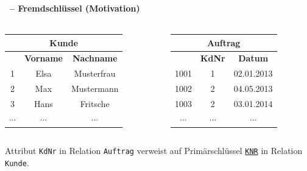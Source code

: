 \begin{frame} 
\frametitle{\insertsection}
\framesubtitle{\insertsubsection \ -- Fremdschl\"ussel (Motivation)}
\begin{columns}
	\begin{column}{.48\textwidth}
		\begin{center}
			\begin{tabular}{|c|c|c|}\hline
				\multicolumn{3}{|c|}{\small \textbf{Kunde}}\\\hline\hline
				\cellcolor{Green}\small \textbf{\key{KNR}} & \small \textbf{Vorname} & \small \textbf{Nachname}  \\\hline
				\cellcolor{Green}\small 1 &\small Elsa &\small Musterfrau \\\hline
				\cellcolor{Green}\small 2 & \small Max &\small  Mustermann  \\\hline
				\cellcolor{Green}\small 3 & \small Hans &\small  Fritsche  \\\hline
				\cellcolor{Green}$\cdots$ & $\cdots$ & $\cdots$  \\\hline
			\end{tabular}
		\end{center}
	\end{column}
	\begin{column}{.48\textwidth}
		\begin{center}
			\begin{tabular}{|c|c|c|}\hline
				\multicolumn{3}{|c|}{\small \textbf{Auftrag}}\\\hline\hline
				\cellcolor{Green}\small \textbf{\key{ANR}} & \cellcolor{Yellow}\small \textbf{KdNr} & \small \textbf{Datum}  \\\hline
				\cellcolor{Green}\small 1001 &\cellcolor{Yellow}\small 1 &\small 02.01.2013 \\\hline
				\cellcolor{Green}\small 1002 &\cellcolor{Yellow}\small 2 &\small  04.05.2013  \\\hline
				\cellcolor{Green}\small 1003 &\cellcolor{Yellow}\small 2 &\small  03.01.2014  \\\hline
				\cellcolor{Green}$\cdots$ & \cellcolor{Yellow}$\cdots$ & $\cdots$  \\\hline
			\end{tabular}
		\end{center}
	\end{column}
\end{columns}
\abs
Attribut \texttt{KdNr} in Relation \texttt{Auftrag} verweist auf Prim\"arschl\"ussel \underline{\texttt{KNR}} 
in Relation \texttt{Kunde}.
\end{frame}

